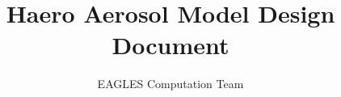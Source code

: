 \documentclass[a4paper, 11pt]{article}
\theoremstyle{definition}
\theoremstyle{remark}
\begin{document}
\title{Haero Aerosol Model Design Document}
\author{
EAGLES Computation Team\\
}
\maketitle







\appendix



\listoftheorems[ignoreall, show={assume,appx}, onlynamed]
\nocite{*}

\end{document}
